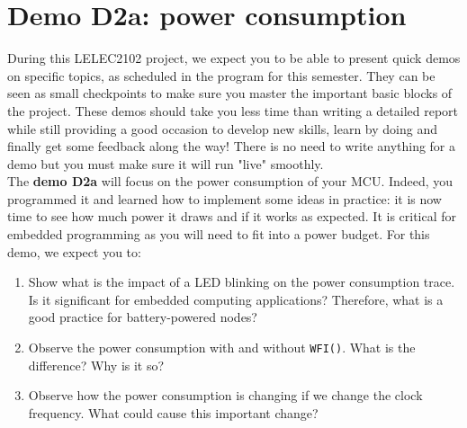 
\section{Demo D2a: power consumption}

During this LELEC2102 project, we expect you to be able to present quick demos on specific topics, as scheduled in the program for this semester. They can be seen as small checkpoints to make sure you master the important basic blocks of the project. These demos should take you less time than writing a detailed report while still providing a good occasion to develop new skills, learn by doing and finally get some feedback along the way! There is no need to write anything for a demo but you must make sure it will run "live" smoothly. \\

The \textbf{demo D2a} will focus on the power consumption of your MCU. Indeed, you programmed it and learned how to implement some ideas in practice: it is now time to see how much power it draws and if it works as expected. It is critical for embedded programming as you will need to fit into a power budget. For this demo, we expect you to:

\begin{enumerate}
    \item Show what is the impact of a LED blinking on the power consumption trace. Is it significant for embedded computing applications? Therefore, what is a good practice for battery-powered nodes?
    \item Observe the power consumption with and without \texttt{WFI()}. What is the difference? Why is it so?
    \item Observe how the power consumption is changing if we change the clock frequency. What could cause this important change?
\end{enumerate}
